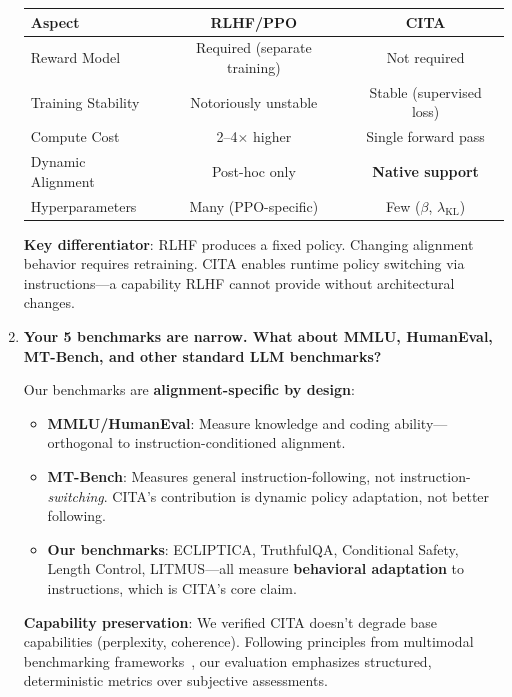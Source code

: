 \begin{enumerate}[label=\textbf{Q\arabic*.}, leftmargin=*, itemsep=8pt]
\begin{table}[H]
\centering
\small
\renewcommand{\arraystretch}{1.2}
\begin{tabular}{@{}lcc@{}}
\toprule
\textbf{Aspect} & \textbf{RLHF/PPO} & \textbf{CITA} \\
\midrule
Reward Model & Required (separate training) & Not required \\ \hline
Training Stability & Notoriously unstable & Stable (supervised loss) \\ \hline
Compute Cost & 2--4$\times$ higher & Single forward pass \\ \hline
Dynamic Alignment & Post-hoc only & \textbf{Native support} \\ \hline
Hyperparameters & Many (PPO-specific) & Few ($\beta$, $\lambda_{\text{KL}}$) \\
\bottomrule
\end{tabular}
\end{table}

\textbf{Key differentiator}: RLHF produces a fixed policy. Changing alignment behavior requires retraining. CITA enables runtime policy switching via instructions---a capability RLHF cannot provide without architectural changes.

\vspace{4mm}

\item \textbf{Your 5 benchmarks are narrow. What about MMLU, HumanEval, MT-Bench, and other standard LLM benchmarks?}

 Our benchmarks are \textbf{alignment-specific by design}:

\begin{itemize}[leftmargin=*,itemsep=2pt]
    \item \textbf{MMLU/HumanEval}: Measure knowledge and coding ability---orthogonal to instruction-conditioned alignment.

    \item \textbf{MT-Bench}: Measures general instruction-following, not instruction-\textit{switching}. CITA's contribution is dynamic policy adaptation, not better following.

    \item \textbf{Our benchmarks}: ECLIPTICA, TruthfulQA, Conditional Safety, Length Control, LITMUS---all measure \textbf{behavioral adaptation} to instructions, which is CITA's core claim.
\end{itemize}

\textbf{Capability preservation}: We verified CITA doesn't degrade base capabilities (perplexity, coherence). Following principles from multimodal benchmarking frameworks~\cite{wanaskar2025multimodal}, our evaluation emphasizes structured, deterministic metrics over subjective assessments.


\end{enumerate}
